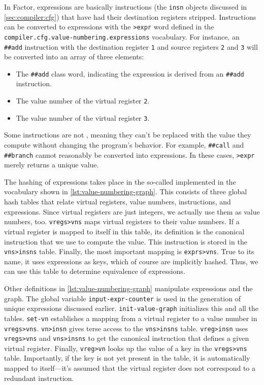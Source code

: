 In Factor, expressions are basically instructions (the \Verb|insn| objects
discussed in \cref{sec:compiler:cfg}) that have had their destination registers
stripped.  Instructions can be converted to expressions with the \Verb|>expr|
word defined in the \Verb|compiler.cfg.value-numbering.expressions|
vocabulary.  For instance, an \Verb|##add| instruction with the destination
register \Verb|1| and source registers \Verb|2| and \Verb|3| will be
converted into an array of three elements:
%
\begin{itemize}
%
  \item The \Verb|##add| class word, indicating the expression is derived
        from an \Verb|##add| instruction.
%
  \item The value number of the virtual register \Verb|2|.
%
  \item The value number of the virtual register \Verb|3|.
%
\end{itemize}
%
\noindent Some instructions are not , meaning
they can't be replaced with the value they compute without changing the
program's behavior.  For example, \Verb|##call| and \Verb|##branch| cannot
reasonably be converted into expressions.  In these cases, \Verb|>expr|
merely returns a unique value.


The hashing of expressions takes place in the so-called 
implemented in the vocabulary shown in \vref{lst:value-numbering-graph}.  This
consists of three global hash tables that relate virtual registers, value
numbers, instructions, and expressions.  Since virtual registers are just
integers, we actually use them as value numbers, too.  \Verb|vregs>vns| maps
virtual registers to their value numbers.  If a virtual register  is mapped to
itself in this table, its definition is the canonical instruction that we use
to compute the value.  This instruction is stored in the \Verb|vns>insns| table.  Finally, the most important mapping is \Verb|exprs>vns|.  True to its
name, it uses expressions as keys, which of course are implicitly hashed.
Thus, we can use this table to determine equivalence of expressions.

Other definitions in \vref{lst:value-numbering-graph} manipulate expressions
and the graph.  The global variable \Verb|input-expr-counter| is used in the
generation of unique expressions discussed earlier.  \Verb|init-value-graph|
initializes this and all the tables.  \Verb|set-vn| establishes a mapping
from a virtual register to a value number in \Verb|vregs>vns|.
\Verb|vn>insn| gives terse access to the \Verb|vns>insns| table.
\Verb|vreg>insn| uses \Verb|vregs>vns| and \Verb|vns>insns| to get the
canonical instruction that defines a given virtual register.  Finally,
\Verb|vreg>vn| looks up the value of a key in the \Verb|vregs>vns| table.
Importantly, if the key is not yet present in the table, it is automatically
mapped to itself---it's assumed that the virtual register does not correspond
to a redundant instruction.

